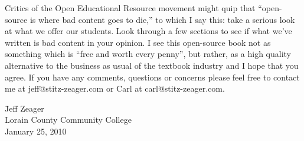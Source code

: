 \documentclass{ximera}
\begin{document}

\noindent  Critics of the Open Educational Resource movement might quip that ``open-source is where bad content goes to die,'' to which I say this: take a serious look at what we offer our students.  Look through a few sections to see if what we've written is bad content in your opinion.  I see this open-source book not as something which is ``free and worth every penny'', but rather, as a high quality alternative to the business as usual of the textbook industry and I hope that you agree.  If you have any comments, questions or concerns please feel free to contact me at jeff@stitz-zeager.com or Carl at carl@stitz-zeager.com.

\vspace{.5in}

\begin{tabbing}

\hspace{4in}   \= Jeff Zeager \\
               \> Lorain County Community College \\
               \> January 25, 2010
               
\end{tabbing}
\end{document}
